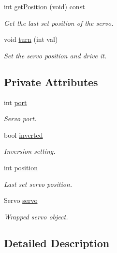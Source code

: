 \begin{DoxyCompactItemize}
int \hyperlink{class_v_e_x_servo_ab8e68afd09a6c67cf71182543f24eb21}{get\+Position} (void) const
\begin{DoxyCompactList}\small\item\em Get the last set position of the servo. \end{DoxyCompactList}\item 
void \hyperlink{class_v_e_x_servo_a2de6039ce58da12f9649fe1e04dc8ea9}{turn} (int val)
\begin{DoxyCompactList}\small\item\em Set the servo position and drive it. \end{DoxyCompactList}\end{DoxyCompactItemize}
\subsection*{Private Attributes}
\begin{DoxyCompactItemize}
\item 
int \hyperlink{class_v_e_x_servo_a34333ff9091be5124f25597c95593291}{port}
\begin{DoxyCompactList}\small\item\em Servo port. \end{DoxyCompactList}\item 
bool \hyperlink{class_v_e_x_servo_a660e5b8a09906d86a4c7b6c7d88042c5}{inverted}
\begin{DoxyCompactList}\small\item\em Inversion setting. \end{DoxyCompactList}\item 
int \hyperlink{class_v_e_x_servo_aa277013ab5c085b050b9a28f61e11e8b}{position}
\begin{DoxyCompactList}\small\item\em Last set servo position. \end{DoxyCompactList}\item 
Servo \hyperlink{class_v_e_x_servo_ab82f78aa9ea59ca24cec69e3e7563c3f}{servo}
\begin{DoxyCompactList}\small\item\em Wrapped servo object. \end{DoxyCompactList}\end{DoxyCompactItemize}


\subsection{Detailed Description}



